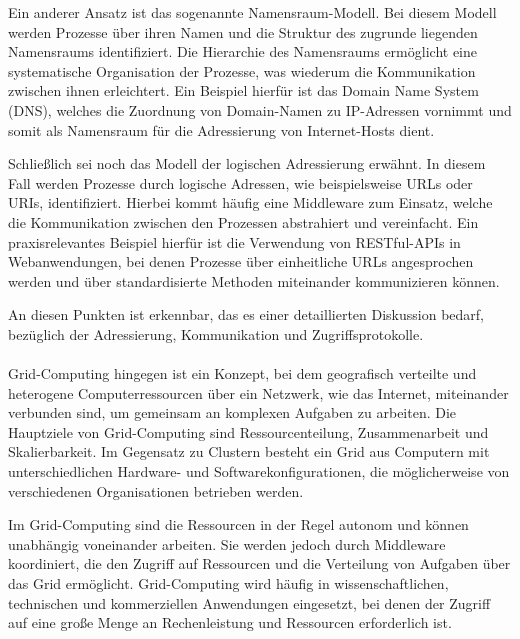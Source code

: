 Ein anderer Ansatz ist das sogenannte Namensraum-Modell. Bei diesem Modell werden Prozesse über ihren Namen und die Struktur des zugrunde liegenden Namensraums identifiziert. Die Hierarchie des Namensraums ermöglicht eine systematische Organisation der Prozesse, was wiederum die Kommunikation zwischen ihnen erleichtert. Ein Beispiel hierfür ist das Domain Name System (DNS), welches die Zuordnung von Domain-Namen zu IP-Adressen vornimmt und somit als Namensraum für die Adressierung von Internet-Hosts dient.

Schließlich sei noch das Modell der logischen Adressierung erwähnt. In diesem Fall werden Prozesse durch logische Adressen, wie beispielsweise URLs oder URIs, identifiziert. Hierbei kommt häufig eine Middleware zum Einsatz, welche die Kommunikation zwischen den Prozessen abstrahiert und vereinfacht. Ein praxisrelevantes Beispiel hierfür ist die Verwendung von RESTful-APIs in Webanwendungen, bei denen Prozesse über einheitliche URLs angesprochen werden und über standardisierte Methoden miteinander kommunizieren können.

An diesen Punkten ist erkennbar, das es einer detaillierten Diskussion bedarf, bezüglich der Adressierung, Kommunikation und Zugriffsprotokolle.
\\\\
Grid-Computing hingegen ist ein Konzept, bei dem geografisch verteilte und heterogene Computerressourcen über ein Netzwerk, wie das Internet, miteinander verbunden sind, um gemeinsam an komplexen Aufgaben zu arbeiten. Die Hauptziele von Grid-Computing sind Ressourcenteilung, Zusammenarbeit und Skalierbarkeit. Im Gegensatz zu Clustern besteht ein Grid aus Computern mit unterschiedlichen Hardware- und Softwarekonfigurationen, die möglicherweise von verschiedenen Organisationen betrieben werden.

Im Grid-Computing sind die Ressourcen in der Regel autonom und können unabhängig voneinander arbeiten. Sie werden jedoch durch Middleware koordiniert, die den Zugriff auf Ressourcen und die Verteilung von Aufgaben über das Grid ermöglicht. Grid-Computing wird häufig in wissenschaftlichen, technischen und kommerziellen Anwendungen eingesetzt, bei denen der Zugriff auf eine große Menge an Rechenleistung und Ressourcen erforderlich ist.
